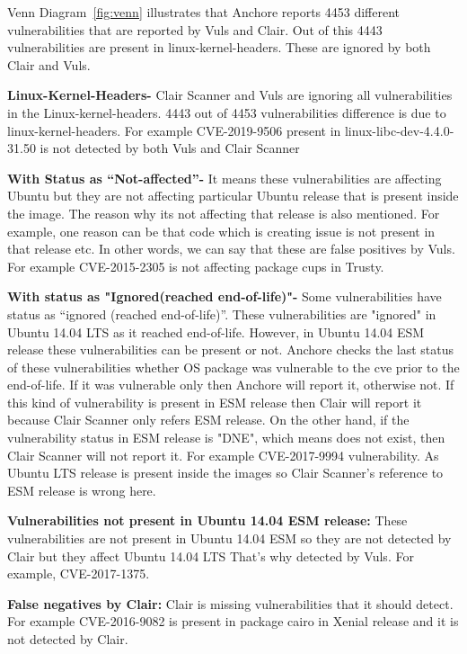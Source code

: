 \documentclass[a4paper,num-refs]{oup-contemporary}
\begin{document}
\begin{Comments}
Venn Diagram~\ref{fig:venn} illustrates that Anchore reports 4453 different vulnerabilities that are reported
by Vuls and Clair. Out of this 4443 vulnerabilities are present in linux-kernel-headers. These are ignored by
both Clair and Vuls.

\textbf{Linux-Kernel-Headers-} Clair Scanner and Vuls are ignoring all vulnerabilities in the Linux-kernel-headers.
4443 out of 4453 vulnerabilities difference is due to linux-kernel-headers.
For example CVE-2019-9506 present in linux-libc-dev-4.4.0-31.50 is not detected by both Vuls and Clair Scanner

\textbf{With Status as “Not-affected”-} It means these vulnerabilities are affecting Ubuntu but they are not 
affecting particular Ubuntu release that is present inside the image. The reason why its not affecting 
that release is also mentioned. For example, one reason can be that code which is creating issue is not 
present in that release etc. In other words, we can say that these are false positives by Vuls.
For example CVE-2015-2305 is not affecting package cups in Trusty.

\textbf{With status as "Ignored(reached end-of-life)"-} Some vulnerabilities have status as “ignored (reached end-of-life)”.
These vulnerabilities are "ignored" in Ubuntu 14.04 LTS as it reached end-of-life. 
However, in Ubuntu 14.04 ESM release these vulnerabilities can be present or not.
Anchore checks the last status of these vulnerabilities whether OS package was vulnerable to the cve
prior to the end-of-life. If it was vulnerable only then Anchore will report it, otherwise not.
If this kind of vulnerability is present in ESM release then Clair will report it because Clair Scanner
only refers ESM release. On the other hand, if the vulnerability
status in ESM release is "DNE", which means does not exist, then Clair Scanner will not report it. 
For example CVE-2017-9994 vulnerability. As Ubuntu LTS release is present inside the images so
Clair Scanner's reference to ESM release is wrong here.

\textbf{Vulnerabilities not present in Ubuntu 14.04 ESM release:} These vulnerabilities are not present in Ubuntu 14.04 ESM so they 
are not detected by Clair but they affect Ubuntu 14.04 LTS That’s why detected by Vuls. For example, CVE-2017-1375.

\textbf{False negatives by Clair:} Clair is missing vulnerabilities that it should detect. For example CVE-2016-9082 
is present in package cairo in Xenial release and it is not detected by Clair.


\end{Comments}
\end{document}
